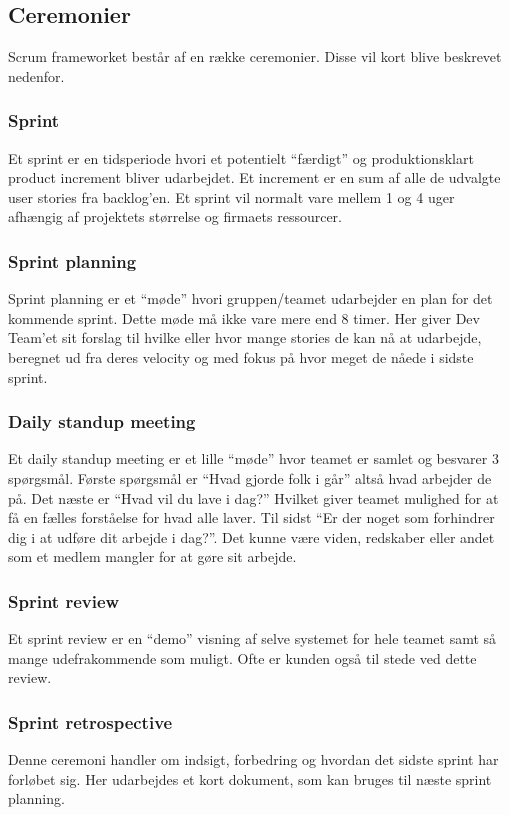 \subsection{Ceremonier}
Scrum frameworket består af en række ceremonier. Disse vil kort blive beskrevet nedenfor.

\subsubsection{Sprint}
Et sprint er en tidsperiode hvori et potentielt “færdigt” og produktionsklart product increment bliver udarbejdet. 
Et increment er en sum af alle de udvalgte user stories fra backlog'en. Et sprint vil normalt vare mellem 1 og 4 uger 
afhængig af projektets størrelse og firmaets ressourcer.

\subsubsection{Sprint planning}
Sprint planning er et “møde” hvori gruppen/teamet udarbejder en plan for det kommende sprint. Dette møde må ikke vare mere end 8 timer. 
Her giver Dev Team'et sit forslag til hvilke eller hvor mange stories de kan nå at udarbejde, beregnet ud fra deres velocity 
og med fokus på hvor meget de nåede i sidste sprint.

\subsubsection{Daily standup meeting}
Et daily standup meeting er et lille “møde” hvor teamet er samlet og besvarer 3 spørgsmål. Første spørgsmål er “Hvad gjorde folk i går” 
altså hvad arbejder de på. Det næste er “Hvad vil du lave i dag?” Hvilket giver teamet mulighed for at få en fælles 
forståelse for hvad alle laver. Til sidst “Er der noget som forhindrer dig i at udføre dit arbejde i dag?”. 
Det kunne være viden, redskaber eller andet som et medlem mangler for at gøre sit arbejde.

\subsubsection{Sprint review}
Et sprint review er en “demo” visning af selve systemet for hele teamet samt så mange udefrakommende som muligt. Ofte er kunden også til stede ved dette review.

\subsubsection{Sprint retrospective}
Denne ceremoni handler om indsigt, forbedring og hvordan det sidste sprint har forløbet sig. Her udarbejdes et kort dokument, som kan bruges til næste sprint planning.

